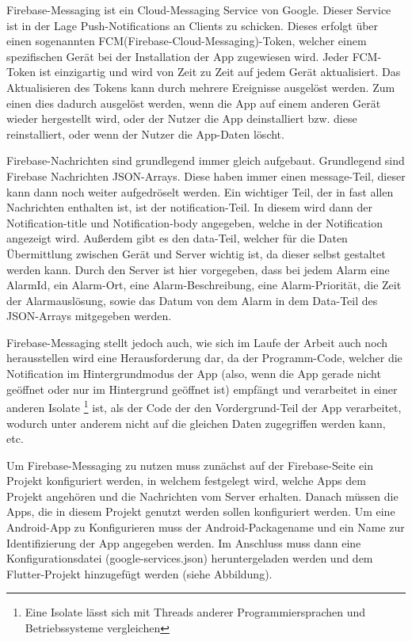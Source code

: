 Firebase-Messaging ist ein Cloud-Messaging Service von Google. Dieser 
Service ist in der Lage Push-Notifications an Clients zu schicken. Dieses erfolgt
über einen sogenannten FCM(Firebase-Cloud-Messaging)-Token, welcher einem 
spezifischen Gerät bei der Installation der App zugewiesen wird. Jeder FCM-Token
ist einzigartig und wird von Zeit zu Zeit auf jedem Gerät aktualisiert.
\cite{FCM-Update} Das Aktualisieren des Tokens kann durch mehrere Ereignisse 
ausgelöst werden. Zum einen dies dadurch ausgelöst werden, wenn die App auf 
einem anderen Gerät wieder hergestellt wird, oder der Nutzer die App 
deinstalliert bzw. diese reinstalliert, oder wenn der Nutzer die App-Daten löscht.

Firebase-Nachrichten sind grundlegend immer gleich aufgebaut. 
Grundlegend sind Firebase Nachrichten JSON-Arrays. Diese haben immer einen
message-Teil, dieser kann dann noch weiter aufgedröselt werden. Ein wichtiger 
Teil, der in fast allen Nachrichten enthalten ist, ist der notification-Teil. 
In diesem wird dann der Notification-title und Notification-body angegeben, 
welche in der Notification angezeigt wird. Außerdem gibt es den data-Teil, 
welcher für die Daten Übermittlung zwischen Gerät und Server wichtig ist, da 
dieser selbst gestaltet werden kann. Durch den Server ist hier vorgegeben, 
dass bei jedem Alarm eine AlarmId, ein Alarm-Ort, eine Alarm-Beschreibung,
eine Alarm-Priorität, die Zeit der Alarmauslösung, sowie das Datum von dem 
Alarm in dem Data-Teil des JSON-Arrays mitgegeben werden.

Firebase-Messaging stellt jedoch auch, wie sich im Laufe der Arbeit auch noch
herausstellen wird eine Herausforderung dar, da der Programm-Code, welcher die
Notification im Hintergrundmodus der App (also,  wenn die App gerade nicht 
geöffnet oder nur im Hintergrund geöffnet ist) empfängt und verarbeitet in einer 
anderen Isolate \footnote{Eine Isolate lässt sich mit Threads anderer 
Programmiersprachen und Betriebssysteme vergleichen} ist, als der Code 
der den Vordergrund-Teil der App verarbeitet, wodurch unter anderem nicht 
auf die gleichen Daten zugegriffen werden kann, etc.

Um Firebase-Messaging zu nutzen muss zunächst auf der Firebase-Seite ein Projekt konfiguriert
werden, in welchem festgelegt wird, welche Apps dem Projekt angehören und die Nachrichten vom 
Server erhalten. 
Danach müssen die Apps, die in diesem Projekt genutzt werden sollen konfiguriert werden. 
Um eine Android-App zu Konfigurieren muss der Android-Packagename und ein Name zur Identifizierung 
der App angegeben werden. Im Anschluss muss dann eine Konfigurationsdatei (google-services.json)
heruntergeladen werden und dem Flutter-Projekt hinzugefügt werden (siehe Abbildung).

